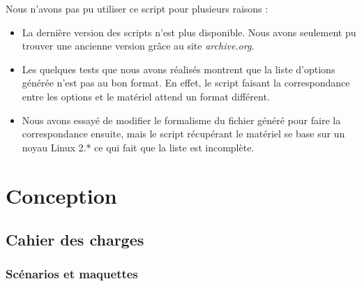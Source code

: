 \documentclass[17pts]{report}
\begin{document}
Nous n'avons pas pu utiliser ce script pour plusieurs raisons :
\begin{itemize}
    \item La dernière version des scripts n'est plus disponible. Nous avons
        seulement pu trouver une ancienne version grâce au site
        \textit{archive.org}.
    \item Les quelques tests que nous avons réalisés montrent que la liste
        d'options générée n'est pas au bon format. En effet, le script faisant
        la correspondance entre les options et le matériel attend un format
        différent.
    \item Nous avons essayé de modifier le formalisme du fichier généré pour
        faire la correspondance ensuite, mais le script récupérant le matériel
        se base sur un noyau Linux 2.* ce qui fait que la liste est incomplète.
\end{itemize}

\chapter{Conception}\thispagestyle{IHA-fancy-style}
\label{cha:Conception}
    \section{Cahier des charges}
    \label{sec:Cahier des charges}
        \subsection{Scénarios et maquettes}
        \label{sub:Scénarios et maquettes}
\end{document}
